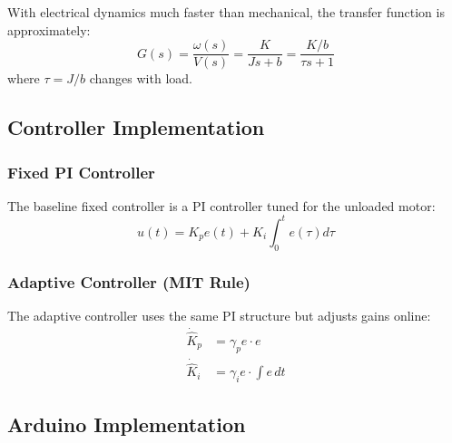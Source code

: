 With electrical dynamics much faster than mechanical, the transfer function is approximately:
\begin{equation}
G(s) = \frac{\omega(s)}{V(s)} = \frac{K}{Js + b} = \frac{K/b}{\tau s + 1}
\label{eq:motor_tf}
\end{equation}
where $\tau = J/b$ changes with load.

\subsection{Controller Implementation}

\subsubsection{Fixed PI Controller}

The baseline fixed controller is a PI controller tuned for the unloaded motor:
\begin{equation}
u(t) = K_p e(t) + K_i \int_0^t e(\tau) d\tau
\label{eq:pi_controller}
\end{equation}

\subsubsection{Adaptive Controller (MIT Rule)}

The adaptive controller uses the same PI structure but adjusts gains online:
\begin{align}
\dot{\hat{K}}_p &= \gamma_p e \cdot e \label{eq:adapt_kp}\\
\dot{\hat{K}}_i &= \gamma_i e \cdot \int e \, dt \label{eq:adapt_ki}
\end{align}

\subsection{Arduino Implementation}

